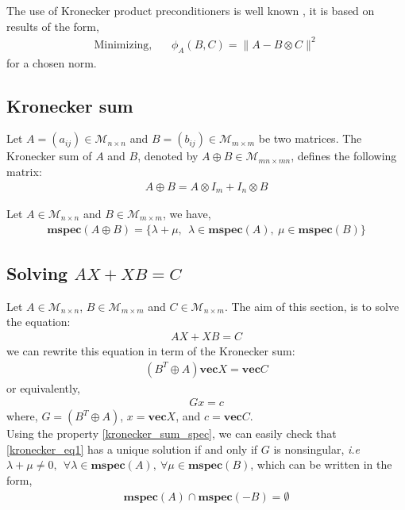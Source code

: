\begin{remark}
The use of Kronecker product preconditioners is well known \cite{vanloan,Langville_Stewart,Elisabeth_Ullmann,GRIGORI:2008:INRIA-00268301:5}, it is based on results of the form,
\begin{align} 
\mbox{Minimizing,}
~~~~~~~~
\phi_A(B,C) = \| A - B \otimes C  \|^2
\end{align}
for a chosen norm.
\end{remark}

\subsection{Kronecker sum}
\begin{definition}
Let $A=(a_{ij}) \in \mathcal{M}_{n \times n}$ and $B=(b_{ij}) \in \mathcal{M}_{m \times m}$ be two matrices. The Kronecker sum of $A$ and $B$, denoted by $A \oplus B  \in \mathcal{M}_{mn \times mn}$, defines the following matrix:
\begin{align}
A \oplus B = A \otimes I_m + I_n \otimes B
\end{align}
\end{definition}

\begin{proposition}
Let $A \in \mathcal{M}_{n \times n}$ and $B \in \mathcal{M}_{m \times m}$, we have,
\begin{align}
\label{kronecker_sum_spec}
\mathbf{mspec} ( A \oplus B ) = \{ \lambda +  \mu,~~\lambda \in \mathbf{mspec}(A),~\mu \in \mathbf{mspec}(B) \}
\end{align}
\end{proposition}

\subsection{Solving $AX+XB=C$}
Let $A \in \mathcal{M}_{n \times n}$, $B \in \mathcal{M}_{m \times m}$ and $C \in \mathcal{M}_{n \times m}$. The aim of this section, is to solve the equation:
\begin{align}
\label{kronecker_eq1}
AX+XB=C
\end{align}
we can rewrite this equation in term of the Kronecker sum:
\begin{align}
(B^T \oplus A)\mathbf{vec}X =\mathbf{vec}C
\end{align}
or equivalently,
\begin{align}
G x = c
\end{align}
where,
$G = (B^T \oplus A)$, $x = \mathbf{vec}X $, and $c = \mathbf{vec}C$.
\\
Using the property \ref{kronecker_sum_spec}, we can easily check that \ref{kronecker_eq1} has a unique solution if and only if $G$ is nonsingular, \textit{i.e} $\lambda +  \mu \neq 0,~~\forall \lambda \in \mathbf{mspec}(A),~\forall \mu \in \mathbf{mspec}(B)$, which can be written in the form,
\begin{align}
\mathbf{mspec}(A) \cap \mathbf{mspec}(-B) = \emptyset
\end{align}


